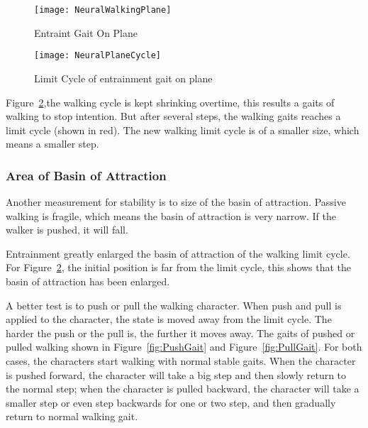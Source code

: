 \begin{figure}[!htbp]
  \begin{center}
     \texttt{[image: NeuralWalkingPlane]}
    \caption{Entraint Gait On Plane}
    \label{fig:neuralwalkinggait}
\end{center}
\end{figure}

\begin{figure}[!htbp]
  \begin{center}
      \texttt{[image: NeuralPlaneCycle]}
    \caption{Limit Cycle of entrainment gait on plane}
    \label{fig:entrainmentLimitCycleOnPlane}
\end{center}
\end{figure}

Figure~\ref{fig:entrainmentLimitCycleOnPlane},the walking cycle is kept shrinking overtime, this results a gaits of walking to stop intention. 
But after several steps, the walking gaits reaches a limit cycle (shown in red). 
The new walking limit cycle is of a smaller size, which means a smaller step.


\subsubsection*{Area of Basin of Attraction}
Another measurement for stability is to size of the basin of attraction.
Passive walking is fragile, which means the basin of attraction is very narrow.
If the walker is pushed, it will fall.

Entrainment greatly enlarged the basin of attraction of the walking limit cycle.
For Figure~\ref{fig:entrainmentLimitCycleOnPlane}, the initial position is far from the limit cycle, this shows that the basin of attraction has been enlarged.

A better test is to push or pull the walking character.
When push and pull is applied to the character, the state is moved away from the limit cycle.
The harder the push or the pull is, the further it moves away.
The gaits of  pushed or pulled walking shown in Figure~\ref{fig:PushGait} and Figure~\ref{fig:PullGait}.
For both cases, the characters start walking with normal stable gaits.
When the character is pushed forward, the character will take a big step and then slowly return to the normal step;
when the character is pulled backward, the character will take a smaller step or even step backwards for one or two step, and then gradually return to normal walking gait.


